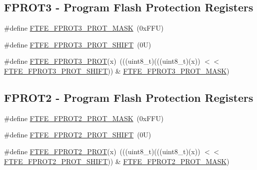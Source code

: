 \subsection*{F\+P\+R\+O\+T3 -\/ Program Flash Protection Registers}
\begin{DoxyCompactItemize}
\item 
\#define \mbox{\hyperlink{group___f_t_f_e___register___masks_gaa08f3df6f890d183bd5864a6d08dc3b9}{F\+T\+F\+E\+\_\+\+F\+P\+R\+O\+T3\+\_\+\+P\+R\+O\+T\+\_\+\+M\+A\+SK}}~(0x\+F\+F\+U)
\item 
\#define \mbox{\hyperlink{group___f_t_f_e___register___masks_ga92b7eeff49fd75ccb8b325326e70967d}{F\+T\+F\+E\+\_\+\+F\+P\+R\+O\+T3\+\_\+\+P\+R\+O\+T\+\_\+\+S\+H\+I\+FT}}~(0\+U)
\item 
\#define \mbox{\hyperlink{group___f_t_f_e___register___masks_gada35908a1ae7d348cf4cd4098d04ad4a}{F\+T\+F\+E\+\_\+\+F\+P\+R\+O\+T3\+\_\+\+P\+R\+OT}}(x)~(((uint8\+\_\+t)(((uint8\+\_\+t)(x)) $<$$<$ \mbox{\hyperlink{group___f_t_f_e___register___masks_ga92b7eeff49fd75ccb8b325326e70967d}{F\+T\+F\+E\+\_\+\+F\+P\+R\+O\+T3\+\_\+\+P\+R\+O\+T\+\_\+\+S\+H\+I\+FT}})) \& \mbox{\hyperlink{group___f_t_f_e___register___masks_gaa08f3df6f890d183bd5864a6d08dc3b9}{F\+T\+F\+E\+\_\+\+F\+P\+R\+O\+T3\+\_\+\+P\+R\+O\+T\+\_\+\+M\+A\+SK}})
\end{DoxyCompactItemize}
\subsection*{F\+P\+R\+O\+T2 -\/ Program Flash Protection Registers}
\begin{DoxyCompactItemize}
\item 
\#define \mbox{\hyperlink{group___f_t_f_e___register___masks_gabb7b44e7187830da8206888d207d9e87}{F\+T\+F\+E\+\_\+\+F\+P\+R\+O\+T2\+\_\+\+P\+R\+O\+T\+\_\+\+M\+A\+SK}}~(0x\+F\+F\+U)
\item 
\#define \mbox{\hyperlink{group___f_t_f_e___register___masks_ga64e4b03106065078a966a0505a18f7bc}{F\+T\+F\+E\+\_\+\+F\+P\+R\+O\+T2\+\_\+\+P\+R\+O\+T\+\_\+\+S\+H\+I\+FT}}~(0\+U)
\item 
\#define \mbox{\hyperlink{group___f_t_f_e___register___masks_gab70774ece52ac5b648e7668853be4405}{F\+T\+F\+E\+\_\+\+F\+P\+R\+O\+T2\+\_\+\+P\+R\+OT}}(x)~(((uint8\+\_\+t)(((uint8\+\_\+t)(x)) $<$$<$ \mbox{\hyperlink{group___f_t_f_e___register___masks_ga64e4b03106065078a966a0505a18f7bc}{F\+T\+F\+E\+\_\+\+F\+P\+R\+O\+T2\+\_\+\+P\+R\+O\+T\+\_\+\+S\+H\+I\+FT}})) \& \mbox{\hyperlink{group___f_t_f_e___register___masks_gabb7b44e7187830da8206888d207d9e87}{F\+T\+F\+E\+\_\+\+F\+P\+R\+O\+T2\+\_\+\+P\+R\+O\+T\+\_\+\+M\+A\+SK}})
\end{DoxyCompactItemize}
